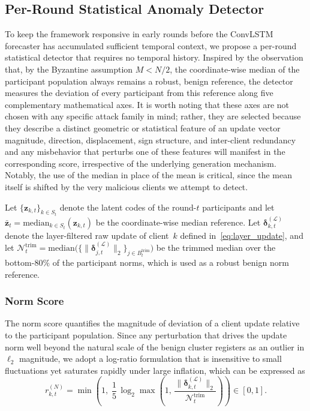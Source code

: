 \documentclass[journal]{IEEEtran}
\begin{document}
\subsection{Per-Round Statistical Anomaly Detector}
\label{sec:stat_detector}

To keep the framework responsive in early rounds before the ConvLSTM forecaster has accumulated sufficient temporal context, we propose a per-round statistical detector that requires no temporal history. Inspired by the observation that, by the Byzantine assumption $M < N/2$, the coordinate-wise median of the participant population always remains a robust, benign reference, the detector measures the deviation of every participant from this reference along five complementary mathematical axes. It is worth noting that these axes are not chosen with any specific attack family in mind; rather, they are selected because they describe a distinct geometric or statistical feature of an update vector magnitude, direction, displacement, sign structure, and inter-client redundancy and any misbehavior that perturbs one of these features will manifest in the corresponding score, irrespective of the underlying generation mechanism. Notably, the use of the median in place of the mean is critical, since the mean itself is shifted by the very malicious clients we attempt to detect.

Let $\{\mathbf{z}_{k,t}\}_{k\in S_t}$ denote the latent codes of the round-$t$ participants and let $\bar{\mathbf{z}}_t = \mathrm{median}_{k \in S_t}(\mathbf{z}_{k,t})$ be the coordinate-wise median reference. Let $\boldsymbol{\delta}_{k,t}^{(\mathcal{L})}$ denote the layer-filtered raw update of client~$k$ defined in~\eqref{eq:layer_update}, and let $\mathcal{N}_t^{\mathrm{trim}} = \mathrm{median}\bigl(\bigl\{\|\boldsymbol{\delta}_{j,t}^{(\mathcal{L})}\|_2\bigr\}_{j \in B_t^{\mathrm{trim}}}\bigr)$ be the trimmed median over the bottom-$80\%$ of the participant norms, which is used as a robust benign norm reference.

\subsubsection{Norm Score}
The norm score quantifies the magnitude of deviation of a client update relative to the participant population. Since any perturbation that drives the update norm well beyond the natural scale of the benign cluster registers as an outlier in $\ell_2$ magnitude, we adopt a log-ratio formulation that is insensitive to small fluctuations yet saturates rapidly under large inflation, which can be expressed as
\begin{equation}
r_{k,t}^{(N)} = \min\!\left(1,\; \frac{1}{5}\,\log_2\max\!\left(1,\, \frac{\|\boldsymbol{\delta}_{k,t}^{(\mathcal{L})}\|_2}{\mathcal{N}_t^{\mathrm{trim}}}\right)\right) \in [0,1].
\label{eq:norm_score}
\end{equation}
\end{document}
